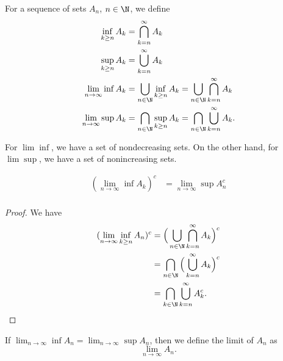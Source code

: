 \begin{definition}[ ]
    For a sequence of sets \( {A}_{n} \), \( n \in \N  \), we define
    \begin{align*}
        \inf_{k \geq n } {A}_{k } &= \bigcap_{ k= n  }^{ \infty  }  {A}_{k}  \\
        \sup_{k \geq n} {A}_{k} &= \bigcup_{ k= n  }^{ \infty  }  {A}_{k} \\
        \lim_{ n \to \infty  } \inf {A}_{k} &= \bigcup_{ n \in \N }^{  } \inf_{k \geq n} {A}_{k} = \bigcup_{ n \in \N  }^{  } \bigcap_{ k = n  }^{ \infty  }  {A}_{k} \\
        \lim_{ n \to \infty  }  \sup {A}_{k} &= \bigcap_{ n \in \N }^{  } \sup_{k \geq n} {A}_{k} = \bigcap_{  n \in \N  }^{  }  \bigcup_{ k= n }^{ \infty  }  {A}_{k}.
    \end{align*}
\end{definition}

For \( \lim \inf  \), we have a set of nondecreasing sets. On the other hand, for \( \lim \sup  \), we have a set of nonincreasing sets. 

\begin{prop}
   \begin{align*}
        (\lim_{ n \to \infty  }  \inf {A}_{k})^{c} &= \lim_{ n \to \infty  }  \sup {A}_{n}^{c} \\
   \end{align*} 
\end{prop}
\begin{proof}
We have 
\begin{align*}
    (\lim_{ n \to \infty  } \inf_{k \geq n}  {A}_{n})^{c} &= \Big(  \bigcup_{ n \in \N  }^{  }  \bigcap_{ k = n  }^{ \infty  }  {A}_{k} \Big)^{c} \\
                                                          &= \bigcap_{  n \in \N  }^{  }  \Big(  \bigcup_{ k = n  }^{ \infty  }  {A}_{k} \Big)^{c} \\
                                                          &= \bigcap_{ k \in \N  }^{  } \bigcup_{ k = n  }^{ \infty  }  {A}_{k}^{c}.
\end{align*}
\end{proof}

\begin{definition}[ ]
    If \( \lim_{ n \to \infty  } \inf  {A}_{n} = \lim_{ n \to \infty  }  \sup {A}_{n} \), then we define the limit of \( {A}_{n}  \) as 
    \[  \lim_{ n \to \infty  }  {A}_{n}. \tag{*} \]
\end{definition}

